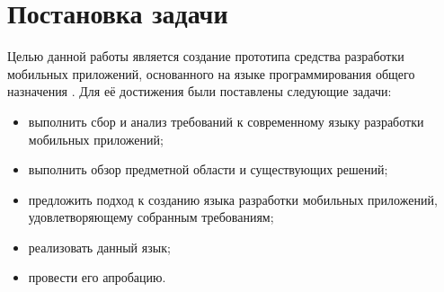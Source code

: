 \section{Постановка задачи}
Целью данной работы является создание прототипа средства разработки
мобильных приложений, основанного на языке программирования общего
назначения . Для её достижения были поставлены следующие задачи:
\begin{itemize}
	\item выполнить сбор и анализ требований к современному языку
	разработки мобильных приложений;
	\item выполнить обзор предметной области и существующих решений;
	\item предложить подход к созданию языка разработки мобильных
	приложений, удовлетворяющему собранным требованиям;
	\item реализовать данный язык;
	\item провести его апробацию.
\end{itemize}